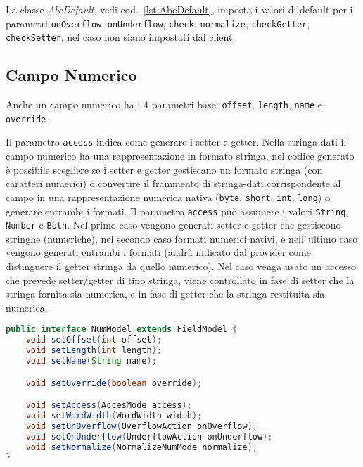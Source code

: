 \documentclass[a4paper,10pt]{report}
\begin{document}
La classe \textsl{AbcDefault}, vedi cod.~\ref{lst:AbcDefault}, imposta i valori
di default per i parametri \verb!onOverflow!, \verb!onUnderflow!, \verb!check!, 
\verb!normalize!, \verb!checkGetter!, \verb!checkSetter!, nel caso non siano 
impostati dal client.

\subsection{Campo Numerico}
Anche un campo numerico ha i 4 parametri base: \verb!offset!, \verb!length!,
\verb!name! e \verb!override!.

Il parametro \verb!access! indica come generare i setter e getter.
Nella stringa-dati il campo numerico ha una rappresentazione in formato stringa,
nel codice generato è possibile scegliere se i setter e getter gestiscano un
formato stringa (con caratteri numerici) o convertire il frammento di 
stringa-dati corrispondente al campo in una rappresentazione numerica nativa 
(\verb!byte!, \verb!short!, \verb!int!, \verb!!\verb!long!) o generare entrambi 
i formati.
Il parametro \verb!access! può assumere i valori \verb!String!, \verb!Number! e 
\verb!Both!. Nel primo caso vengono generati setter e getter che gestiscono
stringhe (numeriche), nel secondo caso formati numerici nativi, e nell'\,ultimo
caso vengono generati entrambi i formati (andrà indicato dal provider come
distinguere il getter stringa da quello numerico).
Nel caso venga usato un accesso che prevede setter/getter di tipo stringa,
viene controllato in fase di setter che la stringa fornita sia numerica,
e in fase di getter che la stringa restituita sia numerica.

\begin{figure*}[!htb]
\begin{lstlisting}[language=java, 
caption=interfaccia NumModel (campo numerico), 
label=lst:NumModel]
public interface NumModel extends FieldModel {
    void setOffset(int offset);
    void setLength(int length);
    void setName(String name);

    void setOverride(boolean override);

    void setAccess(AccesMode access);
    void setWordWidth(WordWidth width);
    void setOnOverflow(OverflowAction onOverflow);
    void setOnUnderflow(UnderflowAction onUnderflow);
    void setNormalize(NormalizeNumMode normalize);
}
\end{lstlisting}
\end{figure*}
\end{document}
